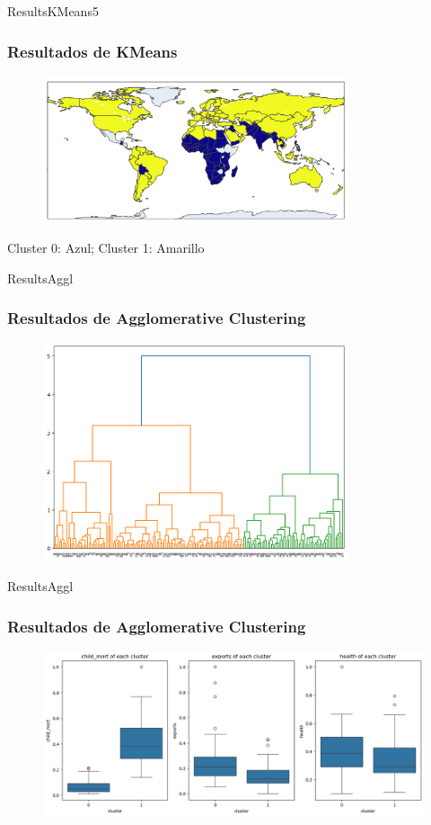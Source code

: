 \documentclass{beamer}
\begin{document}
\begin{frame}{ResultsKMeans5}
  \frametitle{Resultados de KMeans}
  \centering
  \begin{figure}
    \includegraphics[width=0.8\textwidth]{../images/kmeans/map-cropped.png}
  \end{figure}
  Cluster 0: Azul; Cluster 1: Amarillo
\end{frame}

\begin{frame}{ResultsAggl}
  \frametitle{Resultados de Agglomerative Clustering}
  \begin{figure}
    \includegraphics[width=0.8\textwidth]{../images/agglomerative/dendogram.png}
  \end{figure}
\end{frame}

\begin{frame}{ResultsAggl}
  \frametitle{Resultados de Agglomerative Clustering}
  \begin{figure}
    \includegraphics[width=\textwidth]{../images/agglomerative/features-dist-1.jpg}
  \end{figure}
\end{frame}
\end{document}
